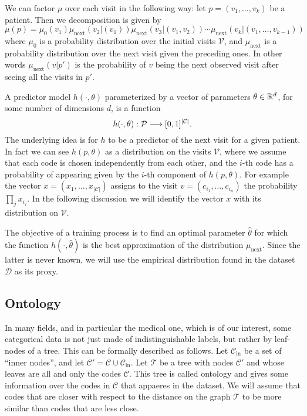 \documentclass[]{marticle}
\newcommand{\ds}{\mathcal{D}}
\newcommand{\codes}{\mathcal{C}}
\newcommand{\codesin}{\mathcal{C}_\text{in}}
\newcommand{\tree }{\mathcal{T}}
\newcommand{\patients}{\mathcal{P}}
\newcommand{\visits}{\mathcal{V}}
\begin{document}
We can factor $\mu$ over each visit in the following way: let $p=(v_1, \dots, v_k)$ be a patient. Then
we decomposition is given by
$$ \mu(p) = \mu_0(v_1) \mu_\text{next} (v_2 | (v_1)) \mu_\text{next} (v_3 |
    (v_1, v_2)) \cdots \mu_\text{next} (v_k | (v_1, \dots, v_{k-1})) $$
where $\mu_0$ is a probability distribution over the initial visits $\visits$, and $\mu_\text{next}$ is a
probability distribution over the next visit given the preceding ones. In other words $\mu_\text{next} (v
| p')$ is the probability of $v$ being the next observed visit after seeing all the visits in $p'$.

A predictor model $h(\cdot, \theta)$ parameterized by a vector of parameters $\theta \in \mathbb{R}^d$, for some
number of dimensions $d$, is a function
$$ h(\cdot, \theta) : \patients \arr [0,1]^{|\codes|}. $$
The underlying idea is for $h$ to be a predictor of the next visit for a given patient. In fact we
can see $h(p, \theta)$ as a distribution on the visits $\visits$, where we assume that each code is
chosen independently from each other, and the $i$-th code has a probability of appearing given by
the $i$-th component of $h(p, \theta)$. For example the vector $x=(x_1, \dots, x_{|\codes|})$ assigns
to the visit $v=(c_{i_1}, \dots, c_{i_n})$ the probability $\prod_j x_{i_j}$. In the following
discussion we will identify the vector $x$ with its distribution on $\visits$.

The objective of a training process is to find an optimal parameter $\hat{\theta}$ for which the
function $h(\cdot, \hat{\theta})$ is the best approximation of the distribution $\mu_\text{next}$. Since the
latter is never known, we will use the empirical distribution found in the dataset $\ds$ as its proxy.

\subsection{Ontology} \label{sect-ontology}

In many fields, and in particular the medical one, which is of our interest, some categorical data
is not just made of indistinguishable labels, but rather by leaf-nodes of a tree. This can be
formally described as follows. Let $\codesin$ be a set of ``inner nodes'', and let $\codes' = \codes
\cup \codesin$. Let $\tree$ be a tree with nodes $\codes'$ and whose leaves are all and only the
codes $\codes$. This tree is called ontology and gives some information over the codes in $\codes$
that appaeres in the dataset. We will assume that codes that are closer with respect to the distance
on the graph $\tree$ to be more similar than codes that are less close.
\end{document}
